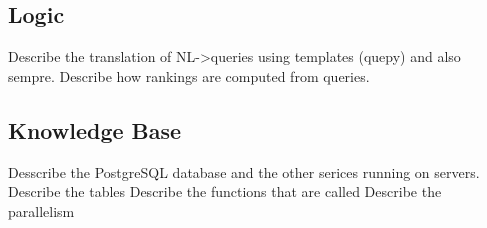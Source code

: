 \subsection{Logic}
Describe the translation of NL->queries using templates (quepy) and also sempre.
Describe how rankings are computed from queries.

\subsection{Knowledge Base}

Desscribe the PostgreSQL database and the other serices running on servers.
Describe the tables 
Describe the functions that are called
Describe the parallelism





